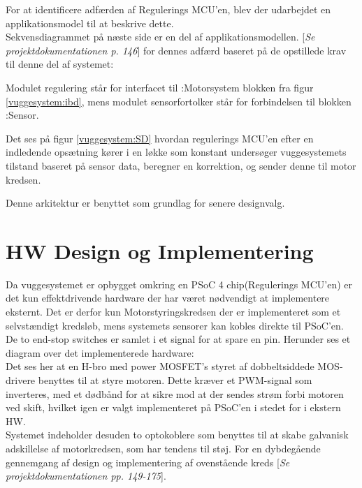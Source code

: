 For at identificere adfærden af Regulerings MCU'en, blev der udarbejdet en applikationsmodel til at beskrive dette.\\Sekvensdiagrammet på næste side er en del af applikationsmodellen. [\textit{Se projektdokumentationen p. 146}] for dennes adfærd baseret på de opstillede krav til denne del af systemet:


Modulet regulering står for interfacet til :Motorsystem blokken fra figur \ref{vuggesystem:ibd}, mens modulet sensorfortolker står for forbindelsen til blokken :Sensor.

Det ses på figur \ref{vuggesystem:SD} hvordan regulerings MCU'en efter en indledende opsætning kører i en løkke som konstant undersøger vuggesystemets tilstand baseret på sensor data, beregner en korrektion, og sender denne til motor kredsen.

Denne arkitektur er benyttet som grundlag for senere designvalg.

\newpage
\section{HW Design og Implementering}
\label{vs_HW}
Da vuggesystemet er opbygget omkring en PSoC 4 chip(Regulerings MCU'en) er det kun effektdrivende hardware der har været nødvendigt at implementere eksternt. Det er derfor kun Motorstyringskredsen der er implementeret som et selvstændigt kredsløb, mens systemets sensorer kan kobles direkte til PSoC'en. De to end-stop switches er samlet i et signal for at spare en pin. Herunder ses et diagram over det implementerede hardware:\\
Det ses her at en H-bro med power MOSFET's styret af dobbeltsiddede MOS-drivere benyttes til at styre motoren. Dette kræver et PWM-signal som inverteres, med et dødbånd for at sikre mod at der sendes strøm forbi motoren ved skift, hvilket igen er valgt implementeret på PSoC'en i stedet for i ekstern HW. \\ Systemet indeholder desuden to optokoblere som benyttes til at skabe galvanisk adskillelse af motorkredsen, som har tendens til støj.
For en dybdegående gennemgang af design og implementering af ovenstående kreds [\textit{Se projektdokumentationen pp. 149-175}].\\

